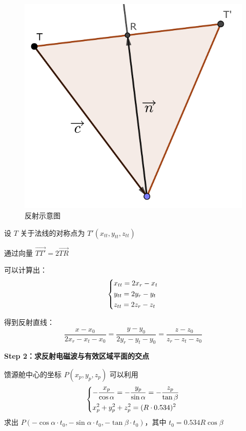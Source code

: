 \documentclass[withoutpreface,bwprint]{cumcmthesis} %
\begin{document}
\begin{figure}[ht!]
    \centering
    \includegraphics[scale=0.65]{reflect.pdf}
    \caption{反射示意图}
\end{figure}
设 $T$ 关于法线的对称点为 $T'(x_{tt},y_{tt},z_{tt})$

通过向量 $\overrightarrow{TT'}=2\overrightarrow{TR}$

可以计算出：
\[
    \begin{dcases}
        x_{tt}=2x_r-x_t \\
        y_{tt}=2y_r-y_t \\
        z_{tt}=2z_r-z_t \\
    \end{dcases}
\]

得到反射直线：
\[
    \frac{x-x_0}{2x_r-x_t-x_0} = \frac{y-y_0}{2y_r-y_t-y_0} = 
    \frac{z-z_0}{z_r-z_t-z_0}
\]

\textbf{Step 2：求反射电磁波与有效区域平面的交点}

馈源舱中心的坐标 $P(x_p,y_p,z_p)$ 可以利用
\[
    \begin{dcases}
        -\frac{x_p}{\cos\alpha} = -\frac{y_p}{\sin\alpha} = -\frac{z_p}{\tan\beta} \\
        x_p^2 + y_p^2 + z_p^2 = (R \cdot 0.534)^2
    \end{dcases}
\]
求出 $P(-\cos\alpha\cdot t_0,-\sin\alpha \cdot t_0,-\tan\beta\cdot t_0)$，其中
$t_0 = 0.534R\cos\beta$
\end{document}
